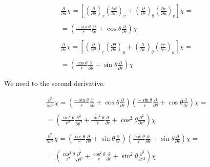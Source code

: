 \begin{equation}
  \begin{array}{c}
    \frac{\partial}{\partial u} \chi= \left[\left(\frac{\partial}{\partial\theta}\right)_{r} \left(\frac{\partial \theta}{\partial u}\right)_v +\left(\frac{\partial}{\partial r}\right)_\theta \left(\frac{\partial r}{\partial u}\right)_v \right] \chi =
    \\

    \\
    = \left(\frac{-\sin\theta}{r}\frac{\partial}{\partial \theta} + \cos\theta\frac{\partial}{\partial r} \right) \chi
    \\

    \\
    \frac{\partial}{\partial v} \chi= \left[\left(\frac{\partial}{\partial\theta}\right)_{r} \left(\frac{\partial \theta}{\partial v}\right)_u +\left(\frac{\partial}{\partial r}\right)_\theta \left(\frac{\partial r}{\partial v}\right)_u \right] \chi =
    \\

    \\
    = \left(\frac{\cos\theta}{r}\frac{\partial}{\partial \theta} + \sin\theta\frac{\partial}{\partial r} \right) \chi
  \end{array}
\end{equation}

We need to the second derivative.

\begin{equation}
  \begin{array}{c}
    \frac{\partial^2}{\partial u^2} \chi = \left(\frac{-\sin\theta}{r}\frac{\partial}{\partial \theta} + \cos\theta\frac{\partial}{\partial r} \right) \left(\frac{-\sin\theta}{r}\frac{\partial}{\partial \theta} + \cos\theta\frac{\partial}{\partial r} \right) \chi =
    \\

    \\
    = \left(\frac{\sin^2\theta}{r^2}\frac{\partial^2}{\partial\theta^2} + \frac{\sin^2\theta}{r}\frac{\partial}{\partial r} + \cos^2\theta \frac{\partial^2}{\partial r^2} \right) \chi
    \\

    \\
    \frac{\partial^2}{\partial v^2} \chi = \left(\frac{\cos\theta}{r}\frac{\partial}{\partial \theta} + \sin\theta\frac{\partial}{\partial r} \right) \left(\frac{\cos\theta}{r}\frac{\partial}{\partial \theta} + \sin\theta\frac{\partial}{\partial r} \right) \chi =
    \\

    \\
    = \left(\frac{\cos^2\theta}{r^2}\frac{\partial^2}{\partial\theta^2} + \frac{\cos^2\theta}{r}\frac{\partial}{\partial r} + \sin^2\theta \frac{\partial^2}{\partial r^2} \right) \chi
  \end{array}
\end{equation}

